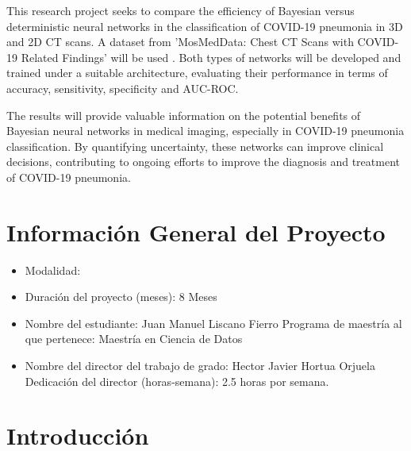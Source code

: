 \documentclass[10pt, oneside, a4paper]{article}
\newcommand{\cmark}{\ding{51}}%
\newcommand{\xmark}{\ding{55}}%
\newcommand{\done}{\rlap{$\square$}{\raisebox{2pt}{\large\hspace{1pt}\cmark}}%
	\hspace{-2.5pt}}
\newcommand{\wontfix}{\rlap{$\square$}{\large\hspace{1pt}\xmark}}
\begin{document}
	\noindent This research project seeks to compare the efficiency of Bayesian versus deterministic neural networks in the classification of COVID-19 pneumonia in 3D and 2D CT scans. A dataset from 'MosMedData: Chest CT Scans with COVID-19 Related Findings' will be used \cite{mosmed}. Both types of networks will be developed and trained under a suitable architecture, evaluating their performance in terms of accuracy, sensitivity, specificity and AUC-ROC. 
	
	\noindent The results will provide valuable information on the potential benefits of Bayesian neural networks in medical imaging, especially in COVID-19 pneumonia classification. By quantifying uncertainty, these networks can improve clinical decisions, contributing to ongoing efforts to improve the diagnosis and treatment of COVID-19 pneumonia.

	\newpage	
	\tableofcontents
	
	\newpage
	\listoffigures
	\listoftables
	
	
	\newpage
	
	\section*{Información General del Proyecto} \label{info_general}
	
	\begin{itemize}
		\item Modalidad:
		\item Duración del proyecto (meses): 8 Meses
		\item Nombre del estudiante: Juan Manuel Liscano Fierro
		\subitem Programa de maestría al que pertenece: Maestría en Ciencia de Datos
		\item Nombre del director del trabajo de grado: Hector Javier Hortua Orjuela
		\subitem Dedicación del director (horas-semana): 2.5 horas por semana.
		
	\end{itemize}

	\newpage
 	\section{Introducción} \label{introduccion}
	
\end{document}
